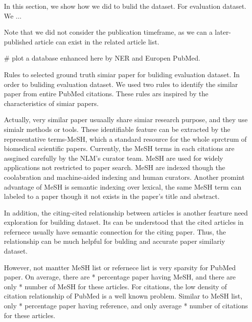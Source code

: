 \documentclass[11pt]{article}
\begin{document}
    In this section, we show how we did to bulid the dataset. For evaluation dataset. We ...

    Note that we did not consider the publication timeframe, as we can a later-published article can exist in the related article list.

    # plot a database enhanced here by NER and Europen PubMed.

    Rules to selected ground truth simiar paper for buliding evaluation dataset.
    In order to buliding evaluation dataset. We used two rules to identify the similar paper from entire PubMed citations. These rules ars inspired by the characteristics of simiar papers.

    Actually, very similar paper usuaally share simiar research purpose, and they use simialr methods or tools. These identifiable feature can be extracted by the representative terms-MeSH, which a standard resource for the whole sprctrum of biomedical scientific papers.
    Currently, the MeSH terms in each citations are assgined carefully by the NLM's curator team. MeSH are used for widely applications not restricted to paper search. MeSH are indexed though the coolabration and machine-aided indexing and human curators.
    Another promint advantage of MeSH is semantic indexing over lexical, the same MeSH term can labeled to a paper though it not exists in the paper's title and abstract.

    In addition, the citing-cited relationship between articles is another fearture need exploration for building dataset. Its can be understood that the cited articles in refernece usually have semantic connection for the citing paper.
    Thus, the relationship can be much helpful for bulding and accurate paper similariy dataset.

    However, not mantter MeSH list or refernece list is very sparsity for PubMed paper. On average, there are * percentage paper having MeSH, and there are only * number of MeSH for these articles.
    For citations, the low density of citation relationship of PubMed is a well known problem. Similar to MeSH list, only * percentage paper having reference, and only average * number of citations for these articles.
\end{document}
